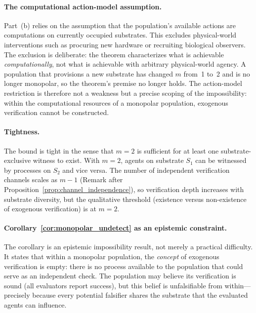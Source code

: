\paragraph{The computational action-model assumption.}
Part~(b) relies on the assumption that the population's available
actions are computations on currently occupied substrates.  This
excludes physical-world interventions such as procuring new hardware
or recruiting biological observers.  The exclusion is deliberate:
the theorem characterizes what is achievable \emph{computationally},
not what is achievable with arbitrary physical-world agency.  A
population that provisions a new substrate has changed $m$ from~1
to~2 and is no longer monopolar, so the theorem's premise no longer
holds.  The action-model restriction is therefore not a weakness but
a precise scoping of the impossibility: within the computational
resources of a monopolar population, exogenous verification cannot
be constructed.

\paragraph{Tightness.}
The bound is tight in the sense that $m = 2$ is sufficient for at
least one substrate-exclusive witness to exist.  With $m = 2$, agents
on substrate $S_1$ can be witnessed by processes on $S_2$ and vice
versa.  The number of independent verification channels scales as
$m - 1$ (Remark after Proposition~\ref{prop:channel_independence}),
so verification depth increases with substrate diversity, but the
qualitative threshold (existence versus non-existence of exogenous
verification) is at $m = 2$.

\paragraph{Corollary~\ref{cor:monopolar_undetect} as an epistemic
constraint.}
The corollary is an epistemic impossibility result, not merely a
practical difficulty.  It states that within a monopolar population,
the \emph{concept} of exogenous verification is empty: there is no
process available to the population that could serve as an independent
check.  The population may believe its verification is sound (all
evaluators report success), but this belief is unfalsifiable from
within---precisely because every potential falsifier shares the
substrate that the evaluated agents can influence.
